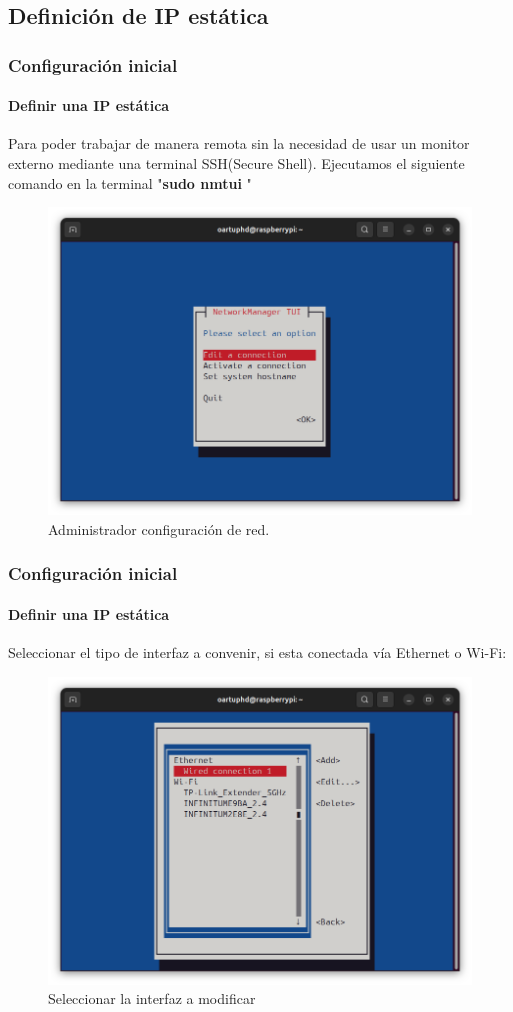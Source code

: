 \documentclass{beamer}
\begin{document}
	\subsection{Definición de IP estática}
	\begin{frame}
		\frametitle{Configuración inicial}
		\framesubtitle{Definir una IP estática}
		Para poder trabajar de manera remota sin la necesidad de usar un monitor externo mediante una terminal SSH(Secure Shell). Ejecutamos el siguiente comando en la terminal "\textbf{sudo nmtui} "
		
		\begin{figure}
			\includegraphics[scale=0.25]{rpissh.png}
			\caption{Administrador configuración de red.}
		\end{figure}
	\end{frame}
	\begin{frame}
	\frametitle{Configuración inicial}
	\framesubtitle{Definir una IP estática}
	Seleccionar el tipo de interfaz a convenir, si esta conectada vía Ethernet o Wi-Fi:
		\begin{figure}
			\includegraphics[scale=0.25]{rpissh2.png}
			\caption{Seleccionar la interfaz a modificar}
		\end{figure}
	\end{frame}
	
\end{document}
